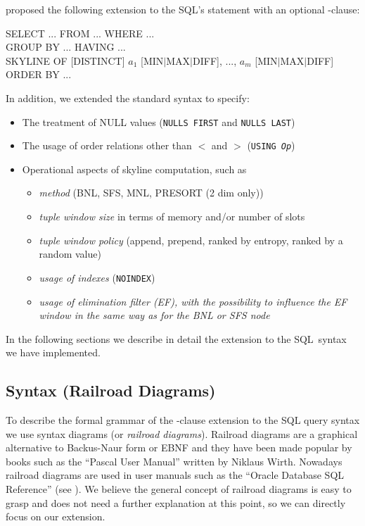 \citet{Borzsonyi2001} proposed the following extension to the SQL's
 statement with an optional -clause:
\begin{sql}
SELECT ... FROM ... WHERE ... \\
GROUP BY ... HAVING ...       \\
SKYLINE OF \textnormal{[}DISTINCT\textnormal{]} $a_1$ \textnormal{[}MIN$|$MAX$|$DIFF\textnormal{]}, ..., $a_m$ \textnormal{[}MIN$|$MAX$|$DIFF\textnormal{]} \\
ORDER BY ...
\end{sql}
\noindent
In addition, we extended the standard syntax to specify:
\begin{itemize}
\item The treatment of NULL values (\texttt{NULLS FIRST} and \texttt{NULLS LAST})
\item The usage of order relations other than $<$ and $>$ (\texttt{USING \emph{Op}})
\item Operational aspects of skyline computation, such as 
\begin{itemize}
\item \emph{method} (BNL, SFS, MNL, PRESORT (2 dim only))
\item \emph{tuple window size} in terms of memory and/or number of slots
\item \emph{tuple window policy} (append, prepend, ranked by entropy, ranked by a random value)
\item \emph{usage of indexes} (\texttt{NOINDEX})
\item \emph{usage of elimination filter (EF), 
  	with the possibility to influence the EF window in the same way
  	as for the BNL or SFS node}
\end{itemize}
\end{itemize}

In the following sections we describe in detail the extension to the SQL~syntax
we have implemented.

\subsection{Syntax (Railroad Diagrams)}
\label{sec:syntax}
To describe the formal grammar of the -clause
extension to the SQL query syntax we use syntax diagrams (or \emph{railroad
diagrams}).  Railroad diagrams are a graphical alternative to
Backus-Naur form or EBNF and they have been made popular by books such
as the ``Pascal User Manual'' written by Niklaus Wirth.  Nowadays
railroad diagrams are used in user manuals such as the ``Oracle
Database SQL Reference'' (see \citep{Oracle2005}).  We believe the
general concept of railroad diagrams is easy to grasp and does not
need a further explanation at this point, so we can directly focus on
our  extension.

